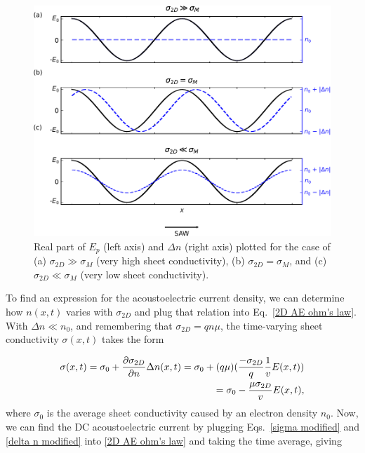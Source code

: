 \documentclass[double,12pt,1in,seploa]{beavtex}
\begin{document}
\begin{figure}
    \includegraphics{piezoelectric field and delta n edited.pdf}
    \caption{Real part of $E_p$ (left axis) and $\Delta n$ (right axis) plotted for the case of (a) $\sigma_{2D} \gg \sigma_M$ (very high sheet conductivity), (b) $\sigma_{2D} = \sigma_M$, and (c) $\sigma_{2D} \ll \sigma_M$ (very low sheet conductivity).}
    \label{piezoelectric field and delta n}
\end{figure}

To find an expression for the acoustoelectric current density, we can determine how $n(x,t)$ varies with $\sigma_{2D}$ and plug that relation into Eq.\ \ref{2D AE ohm's law}. With $\Delta n \ll n_0$, and remembering that $\sigma_{2D} = q n \mu$, the time-varying sheet conductivity $\sigma(x,t)$ takes the form

\begin{equation}
    \begin{split}
        \sigma(x,t) = \sigma_0 + \pdv{\sigma_{2D}}{n} \Delta n(x,t) = \sigma_0 + (q \mu)(\frac{-\sigma_{2D}}{q} \frac{1}{v}E(x,t)) \\
        = \sigma_0 - \frac{\mu \sigma_{2D}}{v}E(x,t),
    \end{split}
    \label{sigma modified}
\end{equation}
where $\sigma_0$ is the average sheet conductivity caused by an electron density $n_0$. Now, we can find the DC acoustoelectric current by plugging Eqs.\ \ref{sigma modified} and \ref{delta n modified} into \ref{2D AE ohm's law} and taking the time average, giving
\end{document}
